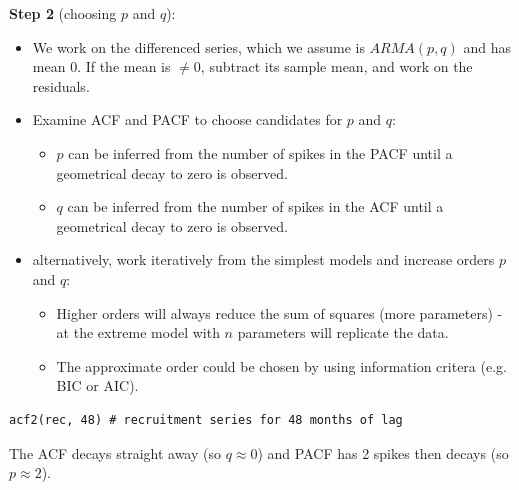 \documentclass[11pt]{article}
\newcommand{\noi}{\noindent}
\begin{document}
\noi \textbf{Step 2} (choosing $p$ and $q$):
\begin{itemize}
    \item We work on the differenced series, which we assume is $ARMA(p, q)$ and has mean $0$. If the mean is $\neq 0$, subtract its sample mean, and work on the residuals.
    \item Examine ACF and PACF to choose candidates for $p$ and $q$:
        \begin{itemize}
            \item $p$ can be inferred from the number of spikes in the PACF until a geometrical decay to zero is observed.
            \item $q$ can be inferred from the number of spikes in the ACF until a geometrical decay to zero is observed.
        \end{itemize}
    \item alternatively, work iteratively from the simplest models and increase orders $p$ and $q$:
        \begin{itemize}
            \item Higher orders will always reduce the sum of squares (more parameters) - at the extreme model with $n$ parameters will replicate the data.
            \item The approximate order could be chosen by using information critera (e.g. BIC or AIC).
        \end{itemize}
\end{itemize}

\begin{lstlisting}
acf2(rec, 48) # recruitment series for 48 months of lag
\end{lstlisting}
\noi The ACF decays straight away (so $q \approx 0$) and PACF has 2 spikes then decays (so $p \approx 2$). \\
\end{document}
